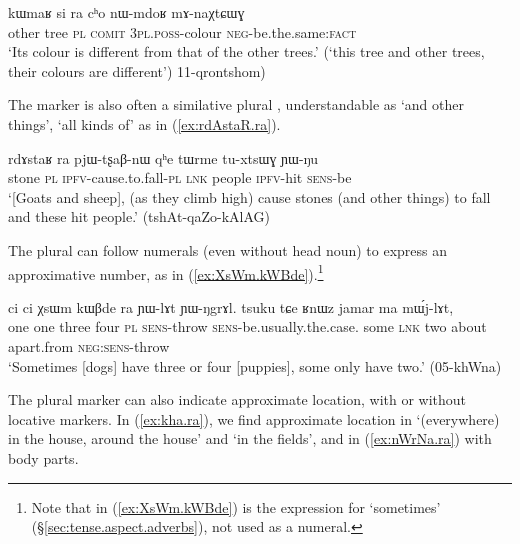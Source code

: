 \begin{exe}
\ex \label{ex:si.ra.cho}
\gll kɯmaʁ si ra cʰo nɯ-mdoʁ mɤ-naχtɕɯɣ \\
other tree \textsc{pl} \textsc{comit} \textsc{3pl}.\textsc{poss}-colour \textsc{neg}-be.the.same:\textsc{fact} \\
\glt `Its colour is different from that of the other trees.' (`this tree and other trees, their colours are different') 11-qrontshom)
\end{exe} 

The marker  is also often a similative plural \citep{mauri18categorization}, understandable as `and other things', `all kinds of' as in (\ref{ex:rdAstaR.ra}).

\begin{exe}
\ex \label{ex:rdAstaR.ra}
\gll rdɤstaʁ ra pjɯ-tʂaβ-nɯ qʰe tɯrme tu-xtsɯɣ ɲɯ-ŋu \\
stone \textsc{pl} \textsc{ipfv}-cause.to.fall-\textsc{pl} \textsc{lnk} people \textsc{ipfv}-hit \textsc{sens}-be \\
\glt `[Goats and sheep], (as they climb high) cause stones (and other things) to fall and these hit people.' (tshAt-qaZo-kAlAG) 
\end{exe} 

The plural can follow numerals (even without head noun) to express an approximative number, as in (\ref{ex:XsWm.kWBde}).\footnote{Note that in (\ref{ex:XsWm.kWBde})  is the expression for `sometimes' (§\ref{sec:tense.aspect.adverbs}), not used as a numeral.} 

\begin{exe}
\ex \label{ex:XsWm.kWBde}
\gll ci ci χsɯm kɯβde ra ɲɯ-lɤt ɲɯ-ŋgrɤl. tsuku tɕe ʁnɯz jamar ma mɯ́j-lɤt,\\
one one three four \textsc{pl} \textsc{sens}-throw \textsc{sens}-be.usually.the.case. some \textsc{lnk} two about apart.from \textsc{neg}:\textsc{sens}-throw \\
\glt  `Sometimes [dogs] have three or four [puppies], some only have two.' (05-khWna)
\end{exe} 

The plural marker  can also indicate approximate location, with or without locative markers. In (\ref{ex:kha.ra}), we find approximate location  in  `(everywhere) in the house, around the house' and  `in the fields', and in (\ref{ex:nWrNa.ra}) with body parts.

